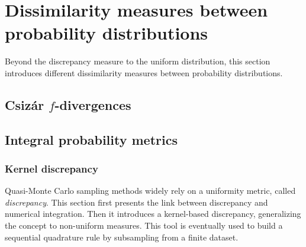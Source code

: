 \cleardoublepage
\chapter{Dissimilarity measures between probability distributions}
\label{apx:B}

Beyond the discrepancy measure to the uniform distribution, this section introduces different dissimilarity measures between probability distributions. 

\section*{Csiz\'{a}r $f$-divergences}




\section*{Integral probability metrics}






\subsection*{Kernel discrepancy}
Quasi-Monte Carlo sampling methods widely rely on a uniformity metric, called \textit{discrepancy}. 
This section first presents the link between discrepancy and numerical integration. 
Then it introduces a kernel-based discrepancy, generalizing the concept to non-uniform measures. 
This tool is eventually used to build a sequential quadrature rule by subsampling from a finite dataset.




